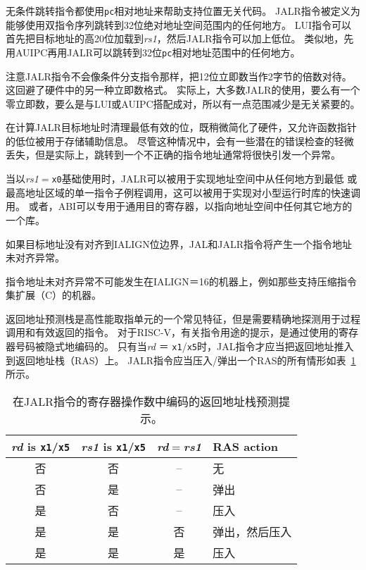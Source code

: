 \begin{commentary}
无条件跳转指令都使用{\tt pc}相对地址来帮助支持位置无关代码。
JALR指令被定义为能够使用双指令序列跳转到32位绝对地址空间范围内的任何地方。
LUI指令可以首先把目标地址的高20位加载到{\em rs1}，然后JALR指令可以加上低位。
类似地，先用AUIPC再用JALR可以跳转到32位{\tt pc}相对地址范围中的任何地方。

注意JALR指令不会像条件分支指令那样，把12位立即数当作2字节的倍数对待。这回避了硬件中的另一种立即数格式。
实际上，大多数JALR的使用，要么有一个零立即数，要么是与LUI或AUIPC搭配成对，所以有一点范围减少是无关紧要的。

在计算JALR目标地址时清理最低有效的位，既稍微简化了硬件，又允许函数指针的低位被用于存储辅助信息。
尽管这种情况中，会有一些潜在的错误检查的轻微丢失，但是实际上，跳转到一个不正确的指令地址通常将很快引发一个异常。

当以{\em rs1}$=${\tt x0}基础使用时，JALR可以被用于实现地址空间中从任何地方到最低
或最高地址区域的单一指令子例程调用，这可以被用于实现对小型运行时库的快速调用。
或者，ABI可以专用于通用目的寄存器，以指向地址空间中任何其它地方的一个库。
\end{commentary}

如果目标地址没有对齐到IALIGN位边界，JAL和JALR指令将产生一个指令地址未对齐异常。

\begin{commentary}
指令地址未对齐异常不可能发生在IALIGN＝16的机器上，例如那些支持压缩指令集扩展（C）的机器。
\end{commentary}

返回地址预测栈是高性能取指单元的一个常见特征，但是需要精确地探测用于过程调用和有效返回的指令。
对于RISC-V，有关指令用途的提示，是通过使用的寄存器号码被隐式地编码的。
只有当{\em rd} ＝ {\tt x1}/{\tt x5}时，JAL指令才应当把返回地址推入到返回地址栈（RAS）上。
JALR指令应当压入/弹出一个RAS的所有情形如表~\ref{rashints}所示。

\begin{table}[hbt]
\centering
\begin{tabular}{|c|c|c|l|}
  \hline
  \textit{rd} is \texttt{x1}/\texttt{x5}
      & \textit{rs1} is \texttt{x1}/\texttt{x5}
            & \textit{rd}$=$\textit{rs1} & RAS action \\
  \hline
  否  & 否  & --  & 无 \\
  否  & 是 & --  & 弹出 \\
  是 & 否  & --  & 压入 \\
  是 & 是 & 否  & 弹出，然后压入 \\
  是 & 是 & 是 & 压入 \\
   \hline
\end{tabular}
\caption{在JALR指令的寄存器操作数中编码的返回地址栈预测提示。}
\label{rashints}
\end{table}

